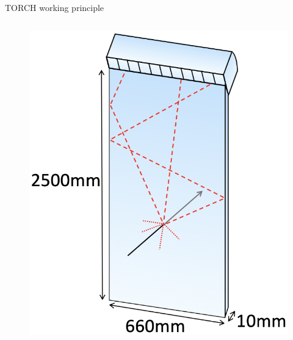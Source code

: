 \documentclass[xcolor={dvipsnames}]{beamer}
\begin{document}
\begin{frame}{TORCH working principle}
\begin{columns}
\begin{column}{0.40\textwidth}
\begin{figure}
        \includegraphics[width = 1.0\textwidth]{Figs/TORCH_FrontView.png}
      \end{figure}
    \end{column}
  \end{columns}
\end{frame}
\end{document}
